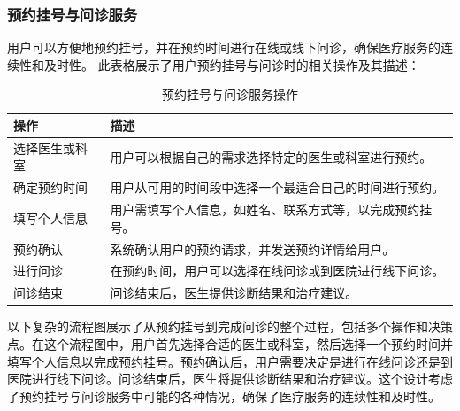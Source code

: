 \subsubsection{预约挂号与问诊服务}
用户可以方便地预约挂号，并在预约时间进行在线或线下问诊，确保医疗服务的连续性和及时性。
此表格展示了用户预约挂号与问诊时的相关操作及其描述：
\begin{table}[htbp]
	\centering
	\begin{tabular}{|p{6cm}|p{6cm}|}
		\hline
		\textbf{操作} & \textbf{描述} \\
		\hline
		选择医生或科室 & 用户可以根据自己的需求选择特定的医生或科室进行预约。 \\
		确定预约时间 & 用户从可用的时间段中选择一个最适合自己的时间进行预约。 \\
		填写个人信息 & 用户需填写个人信息，如姓名、联系方式等，以完成预约挂号。 \\
		预约确认 & 系统确认用户的预约请求，并发送预约详情给用户。 \\
		进行问诊 & 在预约时间，用户可以选择在线问诊或到医院进行线下问诊。 \\
		问诊结束 & 问诊结束后，医生提供诊断结果和治疗建议。 \\
		\hline
	\end{tabular}
	\caption{预约挂号与问诊服务操作}
\end{table}
以下复杂的流程图展示了从预约挂号到完成问诊的整个过程，包括多个操作和决策点。在这个流程图中，用户首先选择合适的医生或科室，然后选择一个预约时间并填写个人信息以完成预约挂号。预约确认后，用户需要决定是进行在线问诊还是到医院进行线下问诊。问诊结束后，医生将提供诊断结果和治疗建议。这个设计考虑了预约挂号与问诊服务中可能的各种情况，确保了医疗服务的连续性和及时性。
